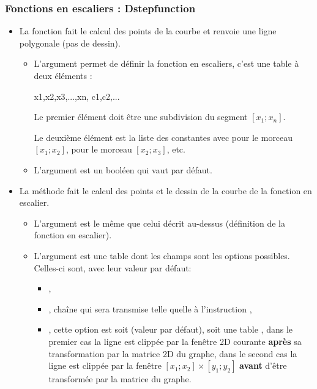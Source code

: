 \subsubsection{Fonctions en escaliers : Dstepfunction}

\begin{itemize}
    \item La fonction  fait le calcul des points de la courbe et renvoie une ligne polygonale (pas de dessin).

      \begin{itemize}
      \item  L'argument  permet de définir la fonction en escaliers, c'est une table à deux éléments :
    
    \begin{TeXcode}
      { {x1,x2,x3,...,xn}, {c1,c2,...} }
    \end{TeXcode}
    
      Le premier élément  doit être une subdivision du segment \([x_1;x_n]\).
      
      Le deuxième élément  est la liste des constantes avec  pour le morceau $[x_1;x_2]$,  pour le morceau $[x_2;x_3]$, etc.
      
      \item   L'argument  est un booléen qui vaut \true par défaut.
      \end{itemize}
  
    \item La méthode  fait le calcul des points et le dessin de la courbe de la fonction en escalier.

      \begin{itemize}
      \item L'argument  est le même que celui décrit au-dessus (définition de la fonction en escalier).
      \item  L'argument  est une table dont les champs sont les options possibles. Celles-ci sont, avec leur valeur par défaut:
    
      \begin{itemize}
          \item {},
          \item {},  chaîne qui sera transmise telle quelle à l'instruction \drawcmd,
          \item {}, cette option est soit \nil (valeur par défaut), soit une table , dans le premier cas la ligne est clippée par la fenêtre 2D courante \textbf{après} sa transformation par la matrice 2D du graphe, dans le second cas la ligne est clippée par la fenêtre $[x_1;x_2]\times[y_1;y_2]$ \textbf{avant} d'être transformée par la matrice du graphe.
      \end{itemize}
    \end{itemize}
\end{itemize}

